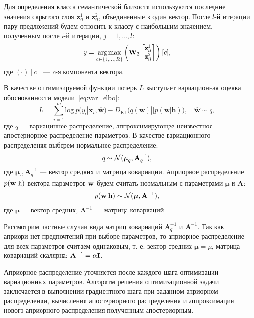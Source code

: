 Для определения класса семантической близости используются последние значения скрытого слоя $\mathbf{z}_{il}^1$ и $\mathbf{z}_{il}^2$, объединенные в один вектор. После $l$-й итерации 
пару предложений будем относить к классу с наибольшим значением, полученным после $l$-й итерации, $j=1,\dots,l$:
\begin{gather}
y = \argmax_{c\in \{1,\dots,R\}}
\left(\mathbf{W}_3%
\begin{bmatrix}
\mathbf{z}_{il}^1\\
\mathbf{z}_{il}^2
\end{bmatrix}\right)[c],
\label{eq:classify}
\end{gather}
где $(\cdot)[c]$ --- $c$-я компонента вектора. 

В качестве оптимизируемой функции потерь $L$ выступает вариационная оценка обоснованности модели~\eqref{eq:var_elbo}:
\begin{equation}
\label{eq:applied_elbo}
    L = \sum_{i=1}^m \text{log}~p({y}_i|\mathbf{x}_i, \hat{\mathbf{w}}) - D_\text{KL}\bigl(q (\mathbf{w}) || p (\mathbf{w}|\mathbf{h})\bigr),\quad \hat{\mathbf{w}} \sim q,
\end{equation}
где $q$ --- вариацинное распределение, аппроксимирующее неизвестное апостериорное распределение параметров.
В качестве вариационного распределения выберем нормальное распределение:
$$q \sim {\mathcal{N}}(\boldsymbol{\mu}_q,\mathbf{A}_q^{-1}),$$
где $\boldsymbol{\mu}_q,\mathbf{A}_q^{-1}$ --- вектор средних и матрица ковариации.
Априорное распределение $p({\textbf{w}}|\mathbf{h})$ вектора параметров ${\textbf{w}}$ будем считать нормальным с параметрами $\boldsymbol{\mu}$ и $\mathbf{A}$:
$$p({\textbf{w}}|\mathbf{h}) \sim {\mathcal{N}}(\boldsymbol{\mu}, \mathbf{A}^{-1}),$$
где $\boldsymbol{\mu}$ --- вектор средних, $\mathbf{A}^{-1}$ --- матрица ковариаций.

Рассмотрим частные случаи вида матриц ковариаций $\mathbf{A}^{-1}_q$ и $\mathbf{A}^{-1}$. Так как априори нет предпочтений при выборе параметров, то априорное распределение для всех параметров считаем одинаковым, т. е. вектор средних $\boldsymbol{\mu} = \mu$, матрица ковариаций скалярна: $\mathbf{A}^{-1} = \alpha{\textbf{I}}$.

Априорное распределение уточняется после каждого шага оптимизации вариационных параметров.
Алгоритм решения оптимизационной задачи заключается в выполнении градиентного шага при заданном априорном распределении, вычислении апостериорного распределения и аппроксимации нового априорного распределения полученным апостериорным.

